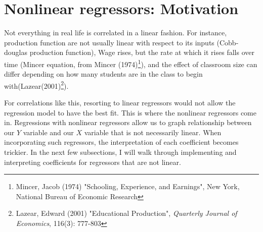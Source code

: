 \section{Nonlinear regressors: Motivation}
Not everything in real life is correlated in a linear fashion. For instance, production function are not usually linear with respect to its inputs (Cobb-douglas production function), Wage rises, but the rate at which it rises falls over time (Mincer equation, from Mincer (1974)\footnote{\scriptsize{Mincer, Jacob (1974) "Schooling, Experience, and Earnings", New York, National Bureau of Economic Research}}), and the effect of classroom size can differ depending on how many students are in the class to begin with(Lazear(2001)\footnote{\scriptsize{Lazear, Edward (2001) "Educational Production", \textit{Quarterly Journal of Economics}, 116(3): 777-803}}). \par\medskip
For correlations like this, resorting to linear regressors would not allow the regression model to have the best fit. This is where the nonlinear regressors come in. Regressions with nonlinear regressors allow us to graph relationship between our $Y$ variable and our $X$ variable that is not necessarily linear. When incorporating such regressors, the interpretation of each coefficient becomes trickier. In the next few subsections, I will walk through implementing and interpreting coefficients for regressors that are not linear. \par\medskip
